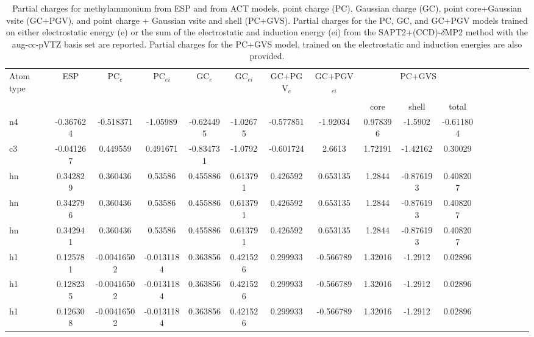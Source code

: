 \begin{sidewaystable}
\caption{Partial charges for methylammonium from ESP and from ACT models, point charge (PC), Gaussian charge (GC), point core+Gaussian vsite (GC+PGV), and point charge + Gaussian vsite and shell (PC+GVS).  Partial charges for the PC, GC, and GC+PGV models trained on either electrostatic energy (e) or the sum of the electrostatic and induction energy (ei) from the SAPT2+(CCD)-$\delta$MP2 method with the aug-cc-pVTZ basis set are reported. Partial charges for the PC+GVS model, trained on the electrostatic and induction energies are also provided.}
\hspace{-1cm}
\begin{tabular}{lcccccccccccccccc}
\hline
 Atom type & ESP & PC$_{e}$ & PC$_{ei}$ & GC$_{e}$ & GC$_{ei}$ & GC+PGV$_{e}$ & GC+PGV$_{ei}$ & \multicolumn{3}{c}{PC+GVS} \\\\
 & & & & & & & & core & shell & total \\
\hline
n4 & -0.367624 & -0.518371 & -1.05989 & -0.624495 & -1.02675 & -0.577851 & -1.92034 & 0.978396 & -1.5902 & -0.611804 \\
c3 & -0.041267 & 0.449559 & 0.491671 & -0.834731 & -1.0792 & -0.601724 & 2.6613 & 1.72191 & -1.42162 & 0.30029 \\
hn & 0.342829 & 0.360436 & 0.53586 & 0.455886 & 0.613791 & 0.426592 & 0.653135 & 1.2844 & -0.876193 & 0.408207 \\
hn & 0.342796 & 0.360436 & 0.53586 & 0.455886 & 0.613791 & 0.426592 & 0.653135 & 1.2844 & -0.876193 & 0.408207 \\
hn & 0.342941 & 0.360436 & 0.53586 & 0.455886 & 0.613791 & 0.426592 & 0.653135 & 1.2844 & -0.876193 & 0.408207 \\
h1 & 0.125781 & -0.00416502 & -0.0131184 & 0.363856 & 0.421526 & 0.299933 & -0.566789 & 1.32016 & -1.2912 & 0.02896 \\
h1 & 0.128235 & -0.00416502 & -0.0131184 & 0.363856 & 0.421526 & 0.299933 & -0.566789 & 1.32016 & -1.2912 & 0.02896 \\
h1 & 0.126308 & -0.00416502 & -0.0131184 & 0.363856 & 0.421526 & 0.299933 & -0.566789 & 1.32016 & -1.2912 & 0.02896 \\
\hline
\end{tabular}
\end{sidewaystable}
